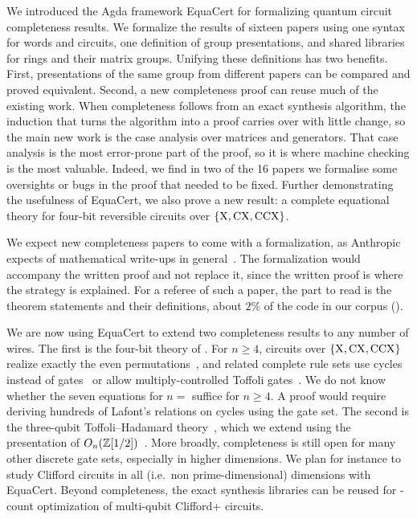 \documentclass[acmsmall,screen,nonacm]{acmart}
\begin{document}
\iffalse
We introduced the Agda framework EquaCert for formalizing quantum circuit completeness results.
We formalize the results of sixteen papers using one syntax for words and circuits, one definition of group presentations, and shared libraries for rings and their matrix groups. Unifying these definitions has two benefits. First, presentations of the same group from different papers can be compared and proved equivalent. Second, a new completeness proof can reuse much of the existing work. When completeness follows from an exact synthesis algorithm, the induction that turns the algorithm into a proof carries over with little change, so the main new work is the case analysis over matrices and generators. That case analysis is the most error-prone part of the proof, so it is where machine checking is the most valuable. Indeed, we find in two of the 16 papers we formalise some oversights or bugs in the proof that needed to be fixed.
Further demonstrating the usefulness of EquaCert, we also prove a new result: a complete equational theory for four-bit reversible circuits over $\{\mathrm{X},\mathrm{CX},\mathrm{CCX}\}$.

We expect new completeness papers to come with a formalization, as Anthropic expects of mathematical write-ups in general~\cite{anthropic2026flt}. The formalization would accompany the written proof and not replace it, since the written proof is where the strategy is explained. For a referee of such a paper, the part to read is the theorem statements and their definitions, about $2\%$ of the code in our corpus ().

We are now using EquaCert to extend two completeness results to any number of wires. The first is the four-bit theory of . For $n\ge4$, circuits over $\{\mathrm{X},\mathrm{CX},\mathrm{CCX}\}$ realize exactly the even permutations~\cite{shende2003synthesis}, and related complete rule sets use cycles instead of gates~\cite{lafont2003boolean} or allow multiply-controlled Toffoli gates~\cite{feng2026complete}. We do not know whether the seven equations for $n=$ suffice for $n\geq 4$. A proof would require deriving hundreds of Lafont's relations on cycles using the gate set.
The second is the three-qubit Toffoli--Hadamard theory~\cite{amy2024toffoli}, which we extend using the presentation of $O_n(\mathbb{Z}[1/2])$~\cite{li2021on}. More broadly, completeness is still open for many other discrete gate sets, especially in higher dimensions. We plan for instance to study Clifford circuits in all (i.e.~non prime-dimensional) dimensions with EquaCert. Beyond completeness, the exact synthesis libraries can be reused for \T-count optimization of multi-qubit Clifford+\T{} circuits.
\end{document}
